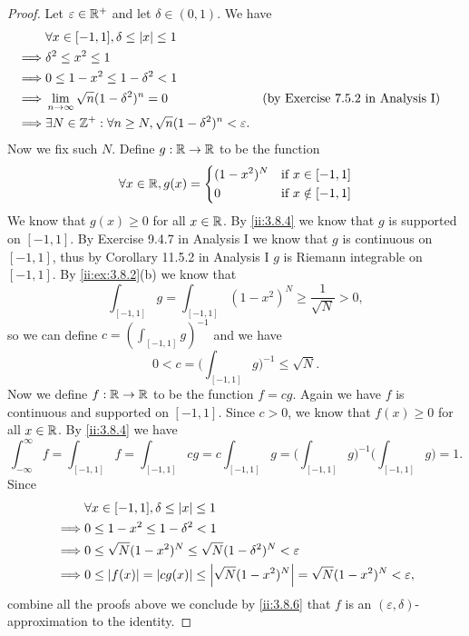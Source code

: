 \begin{proof}
  Let \(\varepsilon \in \mathbb{R}^+\) and let \(\delta \in (0, 1)\).
  We have
  \begin{align*}
             & \forall x \in [-1, 1], \delta \leq \left\lvert x\right\rvert \leq 1                                                                             \\
    \implies & \delta^2 \leq x^2 \leq 1                                                                                                      \\
    \implies & 0 \leq 1 - x^2 \leq 1 - \delta^2 < 1                                                                                          \\
    \implies & \lim_{n \to \infty} \sqrt{n} (1 - \delta^2)^n = 0                               &  & \text{(by Exercise 7.5.2 in Analysis I)} \\
    \implies & \exists N \in \mathbb{Z}^+ : \forall n \geq N, \sqrt{n} (1 - \delta^2)^n < \varepsilon.
  \end{align*}
  Now we fix such \(N\).
  Define \(g : \mathbb{R} \to \mathbb{R}\) to be the function
  \[
    \forall x \in \mathbb{R}, g(x) = \begin{dcases}
      (1 - x^2)^N & \text{if } x \in [-1, 1]    \\
      0           & \text{if } x \notin [-1, 1]
    \end{dcases}
  \]
  We know that \(g(x) \geq 0\) for all \(x \in \mathbb{R}\).
  By \cref{ii:3.8.4} we know that \(g\) is supported on \([-1, 1]\).
  By Exercise 9.4.7 in Analysis I we know that \(g\) is continuous on \([-1, 1]\), thus by Corollary 11.5.2 in Analysis I \(g\) is Riemann integrable on \([-1, 1]\).
  By \cref{ii:ex:3.8.2}(b) we know that
  \[
    \int_{[-1, 1]} g = \int_{[-1, 1]} (1 - x^2)^N \geq \dfrac{1}{\sqrt{N}} > 0,
  \]
  so we can define \(c = (\int_{[-1, 1]} g)^{-1}\) and we have
  \[
    0 < c = \bigg(\int_{[-1, 1]} g\bigg)^{-1} \leq \sqrt{N}.
  \]
  Now we define \(f : \mathbb{R} \to \mathbb{R}\) to be the function \(f = cg\).
  Again we have \(f\) is continuous and supported on \([-1, 1]\).
  Since \(c > 0\), we know that \(f(x) \geq 0\) for all \(x \in \mathbb{R}\).
  By \cref{ii:3.8.4} we have
  \[
    \int_{-\infty}^\infty f = \int_{[-1, 1]} f = \int_{[-1, 1]} cg = c \int_{[-1, 1]} g = \bigg(\int_{[-1, 1]} g\bigg)^{-1} \bigg(\int_{[-1, 1]} g\bigg) = 1.
  \]
  Since
  \begin{align*}
             & \forall x \in [-1, 1], \delta \leq \left\lvert x\right\rvert \leq 1                                                     \\
    \implies & 0 \leq 1 - x^2 \leq 1 - \delta^2 < 1                                                                  \\
    \implies & 0 \leq \sqrt{N} (1 - x^2)^N \leq \sqrt{N} (1 - \delta^2)^N < \varepsilon                              \\
    \implies & 0 \leq \left\lvert f(x)\right\rvert = \left\lvert cg(x)\right\rvert \leq \left\lvert\sqrt{N} (1 - x^2)^N\right\rvert = \sqrt{N} (1 - x^2)^N < \varepsilon,
  \end{align*}
  combine all the proofs above we conclude by \cref{ii:3.8.6} that \(f\) is an \((\varepsilon, \delta)\)-approximation to the identity.
\end{proof}

